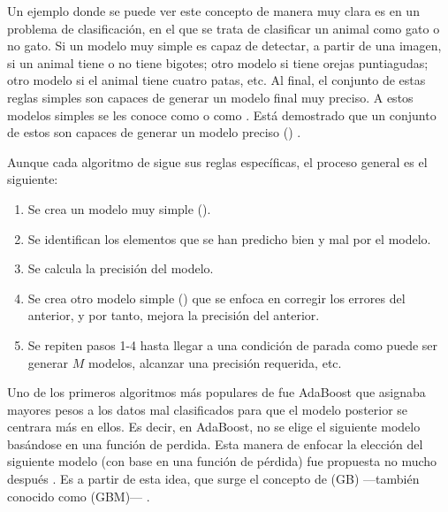 {Un ejemplo donde se puede ver este concepto de manera muy clara es en un problema de clasificación, en el que se trata de clasificar un animal como gato o no gato. Si un modelo muy simple es capaz de detectar, a partir de una imagen, si un animal tiene o no tiene bigotes; otro modelo si tiene orejas puntiagudas; otro modelo si el animal tiene cuatro patas, etc. Al final, el conjunto de estas reglas simples son capaces de generar un modelo final muy preciso. A estos modelos simples se les conoce como  o como \fnm. Está demostrado que un conjunto de estos son capaces de generar un modelo preciso () \parencite{weakLearnStrongLearn}.

Aunque cada algoritmo de  sigue sus reglas específicas, el proceso general es el siguiente:
\begin{enumerate}
    \item Se crea un modelo muy simple ().
    \item Se identifican los elementos que se han predicho bien y mal por el modelo.
    \item Se calcula la precisión del modelo.
    \item Se crea otro modelo simple () que se enfoca en corregir los errores del anterior, y por tanto, mejora la precisión del anterior.
    \item Se repiten pasos 1-4 hasta llegar a una condición de parada como puede ser generar $M$ modelos, alcanzar una precisión requerida, etc.
\end{enumerate}

Uno de los primeros algoritmos más populares de  fue AdaBoost \parencite{adaBoostTheory} \parencite{adaBoostPract} que asignaba mayores pesos a los datos mal clasificados para que el modelo posterior se centrara más en ellos. Es decir, en AdaBoost, no se elige el siguiente modelo basándose en una función de perdida. Esta manera de enfocar la elección del siguiente modelo (con base en una función de pérdida) fue propuesta no mucho después \parencite{costFunction}. Es a partir de esta idea, que surge el concepto de  (GB) ---también conocido como   (GBM)--- \parencite{GBM}.

}
